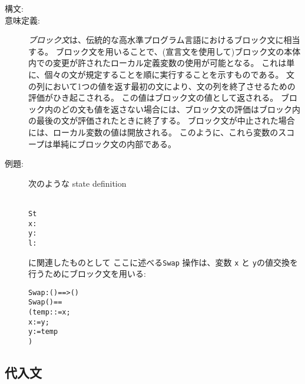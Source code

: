 \documentclass[\pformat,12pt]{jarticle}
\begin{document}
\begin{description}
\item[構文:]




\item[意味定義:] {\it ブロック文}は、伝統的な高水準プログラム言語におけるブロック文に相当する。
ブロック文を用いることで、(宣言文を使用して)ブロック文の本体内での変更が許されたローカル定義変数の使用が可能となる。
これは単に、個々の文が規定することを順に実行することを示すものである。
文の列において1つの値を返す最初の文により、文の列を終了させるための評価がひき起こされる。
この値はブロック文の値として返される。
ブロック内のどの文も値を返さない場合には、ブロック文の評価はブロック内の最後の文が評価されたときに終了する。
ブロック文が中止された場合には、ローカル変数の値は開放される。
このように、これら変数のスコープは単純にブロック文の内部である。
      
\item[例題:] 次のような
state definition
  \begin{alltt}\label{stdef}
   St 
    x:
    y:
    l:
  \end{alltt}
に関連したものとして
ここに述べる\texttt{Swap} 操作は、変数 \texttt{x} と \texttt{y}の値交換を行うためにブロック文を用いる:
  \begin{alltt}
  Swap : () ==> ()
  Swap () ==
    ( temp:  := x;
     x := y;
     y := temp
    )
  \end{alltt}

\end{description}

\subsection{代入文}
\end{document}
